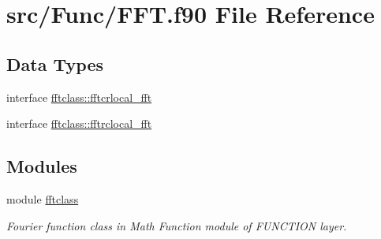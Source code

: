 \hypertarget{_f_f_t_8f90}{}\section{src/\+Func/\+F\+FT.f90 File Reference}
\label{_f_f_t_8f90}
\subsection*{Data Types}
\begin{DoxyCompactItemize}
\item 
interface \mbox{\hyperlink{interfacefftclass_1_1fftcrlocal__fft}{fftclass\+::fftcrlocal\+\_\+fft}}
\item 
interface \mbox{\hyperlink{interfacefftclass_1_1fftrclocal__fft}{fftclass\+::fftrclocal\+\_\+fft}}
\end{DoxyCompactItemize}
\subsection*{Modules}
\begin{DoxyCompactItemize}
\item 
module \mbox{\hyperlink{namespacefftclass}{fftclass}}
\begin{DoxyCompactList}\small\item\em Fourier function class in Math Function module of F\+U\+N\+C\+T\+I\+ON layer. \end{DoxyCompactList}\end{DoxyCompactItemize}
